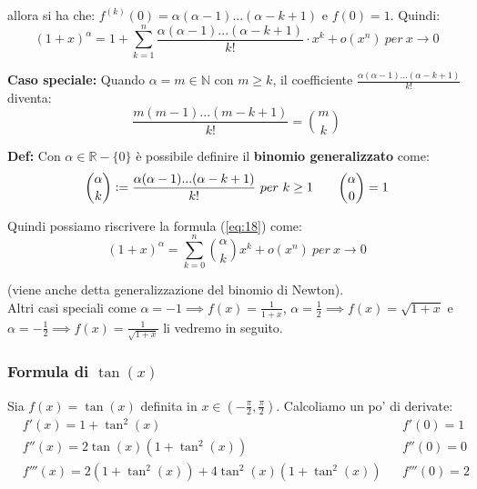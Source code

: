 \documentclass{article}
\begin{document}
\noindent allora si ha che: $f^{(k)}(0) = \alpha(\alpha - 1)...(\alpha - k + 1)$ e $f(0) = 1$. Quindi:
\begin{equation}
    (1 + x)^\alpha = 1 + \sum_{k = 1}^n \frac{\alpha(\alpha - 1)...(\alpha - k + 1)}{k!} \cdot x^k + o(x^n) \ per \ x \to 0
    \label{eq:18}
\end{equation}

\noindent\textbf{Caso speciale: } Quando $\alpha = m \in \mathbb{N}$ con $m \geq k$, il coefficiente $\frac{\alpha(\alpha - 1)...(\alpha - k + 1)}{k!}$ diventa:
\begin{equation*}
    \frac{m(m - 1)...(m - k + 1)}{k!} = \binom{m}k{}
\end{equation*}

\noindent\textbf{Def:} Con $\alpha \in \mathbb{R} - \{0\}$ è possibile definire il \textbf{binomio generalizzato} come:
\begin{equation*}
    \binom{\alpha}{k} \vcentcolon = \frac{\alpha(\alpha - 1)...(\alpha - k + 1)}{k!} \ per \ k \geq 1 \qquad \binom{\alpha}{0} = 1
\end{equation*}

\noindent Quindi possiamo riscrivere la formula (\ref{eq:18}) come:
\begin{equation*}
    (1 + x)^\alpha = \sum_{k = 0}^n \binom{\alpha}{k} x^k + o(x^n) \ per \ x \to 0
\end{equation*}

\noindent (viene anche detta generalizzazione del binomio di Newton).\\

\noindent Altri casi speciali come $\alpha = -1 \implies f(x) = \frac{1}{1 + x}$, $\alpha = \frac{1}{2} \implies f(x) = \sqrt{1 + x}$ e $\alpha = -\frac{1}{2} \implies f(x) = \frac{1}{\sqrt{1 + x}}$ li vedremo in seguito.

\subsubsection{Formula di $\tan(x)$}
Sia $f(x) = \tan(x)$ definita in $x \in (-\frac{\pi}{2}, \frac{\pi}{2})$. Calcoliamo un po' di derivate:
\begin{align*}
    & f'(x) = 1 + \tan^2(x) && f'(0) = 1 \\
    & f''(x) = 2\tan(x)(1 + \tan^2(x)) && f''(0) = 0 \\
    & f'''(x) = 2(1 + \tan^2(x)) + 4\tan^2(x)(1 + \tan^2(x)) && f'''(0) = 2 \\
\end{align*}
\end{document}
